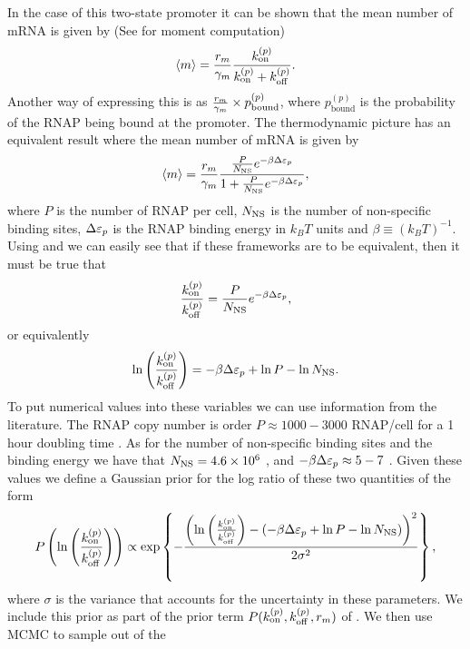 In the case of this two-state promoter it can be shown that the mean number of
mRNA is given by \cite{Sanchez2013} (See  for moment
computation)
\begin{equation}
  \left\langle m \right\rangle = {r_m \over \gamma _m} {k^{(p)}_{\text{on}} \over k^{(p)}_{\text{on}} + k^{(p)}_{\text{off}}}.
  \label{seq_mean_kinetic}
\end{equation}
Another way of expressing this is as ${r_m \over \gamma _m} \times
p_{\text{bound}}^{(p)}$, where $p_{\text{bound}}^{(p)}$ is the probability of
the RNAP being bound at the promoter. The thermodynamic picture has an
equivalent result where the mean number of mRNA is given by \cite{Brewster2012,
Bintu2005a}
\begin{equation}
  \left\langle m \right\rangle = {r_m \over \gamma _m}
  {{P \over N_\text{NS}} e^{-\beta\Delta\varepsilon_p}
  \over 1 + {P \over N_\text{NS}} e^{-\beta\Delta\varepsilon_p}},
  \label{seq_mean_thermo}
\end{equation}
where $P$ is the number of RNAP per cell, $N_\text{NS}$ is the number of non-specific
binding sites, $\Delta\varepsilon_p$ is the RNAP binding energy in $k_BT$ units and $\beta\equiv
{(k_BT)}^{-1}$. Using  and  we can
easily see that if these frameworks are to be equivalent, then it must be true
that
\begin{equation}
  {k^{(p)}_{\text{on}}\over k^{(p)}_{\text{off}}} = {P \over N_\text{NS}} e^{-\beta\Delta\varepsilon_p},
\end{equation}
or equivalently
\begin{equation}
  \ln \left({k^{(p)}_{\text{on}} \over k^{(p)}_{\text{off}}}\right) =
  -\beta\Delta\varepsilon_p + \ln P - \ln N_\text{NS}.
\end{equation}
To put numerical values into these variables we can use information from the
literature. The RNAP copy number is order $P \approx 1000-3000$ RNAP/cell for a
1 hour doubling time \cite{Klumpp2008}.
As for the number of non-specific
binding sites and the binding energy we have that $N_\text{NS} = 4.6\times 10^6$
\cite{Bintu2005a}, and $-\beta\Delta\varepsilon_p \approx 5 - 7$
\cite{Brewster2012}. Given these values we define a Gaussian prior for the log
ratio of these two quantities of the form
\begin{equation}
  P\left(\ln \left({k^{(p)}_{\text{on}} \over k^{(p)}_{\text{off}}}\right) \right) \propto
  \exp \left\{ - {\left(\ln \left({k^{(p)}_{\text{on}} \over k^{(p)}_{\text{off}}}\right) -
  \left(-\beta\Delta\varepsilon_p + \ln P - \ln N_\text{NS} \right) \right)^2
  \over 2 \sigma^2} \right\},
  \label{seq_prior_single}
\end{equation}
where $\sigma$ is the variance that accounts for the uncertainty in these
parameters. We include this prior as part of the prior term $P(k^{(p)}_{\text{on}}, k^{(p)}_{\text{off}},
r_m)$ of . We then use MCMC to sample out of the
